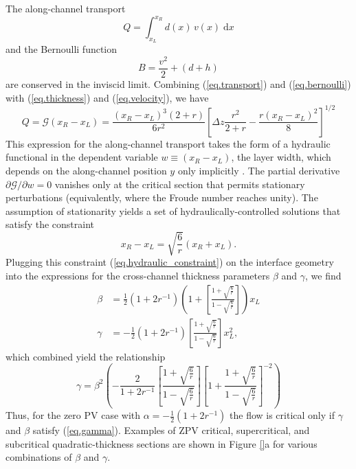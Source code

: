 \documentclass{jfm}
\begin{document}
The along-channel transport 
\begin{equation}\label{eq.transport}
Q = \int_{x_{L}}^{x_{R}} d(x)\, v(x)\; \text{d}x
\end{equation}
and the Bernoulli function
\begin{equation}\label{eq.bernoulli}
B = \frac{v^{2}}{2} + (d + h)
\end{equation}
are conserved in the inviscid limit. Combining (\ref{eq.transport}) and (\ref{eq.bernoulli}) with (\ref{eq.thickness}) and (\ref{eq.velocity}), we have
\begin{equation}
    Q = \mathcal{G}(x_{R}-x_{L}) = \frac{(x_{R} - x_{L})^{3} (2+r)}{6r^{2}} \left[ \Delta z\frac{  r^{2}}{2+r} - \frac{r(x_{R} - x_{L})^{2}}{8} \right]^{1/2}
\end{equation}
This expression for the along-channel transport takes the form of a hydraulic functional in the dependent variable $w \equiv (x_{R} - x_{L})$, the layer width, which depends on the along-channel position $y$ only implicitly \citep{gill_hydraulics_1977}. The partial derivative $\partial \mathcal{G}/\partial w = 0$ vanishes only at the critical section that permits stationary perturbations (equivalently, where the Froude number reaches unity). The assumption of stationarity yields a set of hydraulically-controlled solutions that satisfy the constraint
\begin{equation}\label{eq.hydraulic_constraint}
x_{R}-x_{L} = \sqrt{\frac{6}{r}}\left( x_{R} + x_{L} \right).
\end{equation}
Plugging this constraint (\ref{eq.hydraulic_constraint}) on the interface geometry into the expressions for the cross-channel thickness parameters $\beta$ and $\gamma$, we find
\begin{align}\label{eq.beta}
\beta &= \frac{1}{2}(1+2r^{-1})\left(1+\left[ \frac{1+\sqrt{\frac{6}{r}}}{1-\sqrt{\frac{6}{r}}} \right] \right)x_{L}\\
\gamma &= -\frac{1}{2}(1+2r^{-1}) \left[ \frac{1+\sqrt{\frac{6}{r}}}{1-\sqrt{\frac{6}{r}}} \right] x_{L}^{2},
\end{align}
which combined yield the relationship
\begin{equation}\label{eq.gamma}
\gamma = \beta^{2} \left(-\frac{2}{1+2r^{-1}} \left[ \frac{1+\sqrt{\frac{6}{r}}}{1-\sqrt{\frac{6}{r}}} \right] \left[ 1+ \frac{1+\sqrt{\frac{6}{r}}}{1-\sqrt{\frac{6}{r}}} \right]^{-2} \right)
\end{equation}
Thus, for the zero PV case with $\alpha = -\frac{1}{2}(1+2r^{-1})$ the flow is critical only if $\gamma$ and $\beta$ satisfy (\ref{eq.gamma}). Examples of ZPV critical, supercritical, and subcritical quadratic-thickness sections are shown in Figure \ref{}a for various combinations of $\beta$ and $\gamma$.
\end{document}

